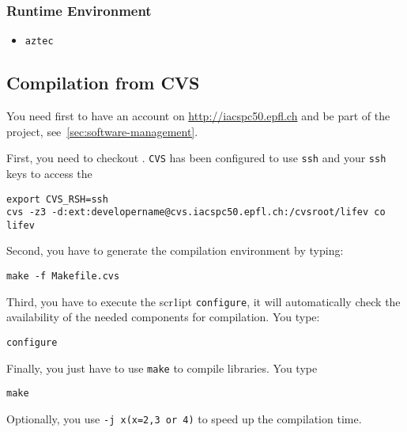 \subsubsection{Runtime Environment}
\label{sec:runtime-env} 

\begin{itemize}
\item \verb!aztec!
\end{itemize} 

\subsection{Compilation from CVS}
\label{sec:compile-cvs} 
You need first to have an account on \url{http://iacspc50.epfl.ch} and be part of the \lifev project, see~\ref{sec:software-management}.

\noindent First, you need to checkout \lifev. \verb!CVS! has been configured to use \verb!ssh! and your \verb!ssh! keys to access the 
\begin{verbatim}
export CVS_RSH=ssh
cvs -z3 -d:ext:developername@cvs.iacspc50.epfl.ch:/cvsroot/lifev co lifev
\end{verbatim}

\noindent Second, you have to generate the compilation environment by typing:
\begin{verbatim}
make -f Makefile.cvs
\end{verbatim}

\noindent Third, you have to execute the scr1ipt \verb!configure!, it will automatically check the availability of the needed components for \lifev compilation. You type:
\begin{verbatim}
configure
\end{verbatim}

\noindent Finally, you just have to use \verb!make! to compile \lifev libraries. You type
\begin{verbatim}
make 
\end{verbatim}
Optionally, you use \verb!-j x(x=2,3 or 4)! to speed up the compilation time.

